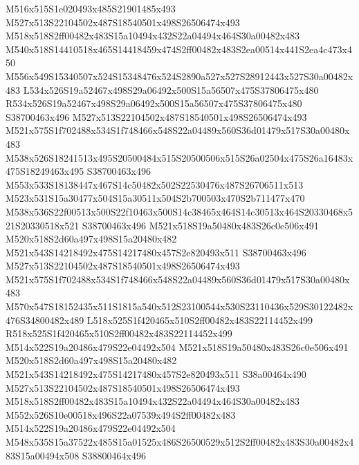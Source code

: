 \documentclass{article}
\begin{document}
\begin{multicols}{2}
M516x515S1e020493x485S21901485x493 M527x513S22104502x487S18540501x498S26506474x493 M518x518S2ff00482x483S15a10494x432S22a04494x464S30a00482x483 M540x518S14410518x465S14418459x474S2ff00482x483S2ea00514x441S2ea4c473x450 M556x549S15340507x524S15348476x524S2890a527x527S28912443x527S30a00482x483 L534x526S19a52467x498S29a06492x500S15a56507x475S37806475x480 R534x526S19a52467x498S29a06492x500S15a56507x475S37806475x480 S38700463x496 M527x513S22104502x487S18540501x498S26506474x493 M521x575S1f702488x534S1f748466x548S22a04489x560S36d01479x517S30a00480x483 M538x526S18241513x495S20500484x515S20500506x515S26a02504x475S26a16483x475S18249463x495 S38700463x496 M553x533S18138447x467S14c50482x502S22530476x487S26706511x513 M523x531S15a30477x504S15a30511x504S2b700503x470S2b711477x470 M538x536S22f00513x500S22f10463x500S14c38465x464S14c30513x464S20330468x521S20330518x521 S38700463x496 M521x518S19a50480x483S26c0e506x491 M520x518S2d60a497x498S15a20480x482 M521x543S14218492x475S14217480x457S2e820493x511 S38700463x496 M527x513S22104502x487S18540501x498S26506474x493 M521x575S1f702488x534S1f748466x548S22a04489x560S36d01479x517S30a00480x483 M570x547S18152435x511S1815a540x512S23100544x530S23110436x529S30122482x476S34800482x489 L518x525S1f420465x510S2ff00482x483S22114452x499 R518x525S1f420465x510S2ff00482x483S22114452x499 M514x522S19a20486x479S22e04492x504 M521x518S19a50480x483S26c0e506x491 M520x518S2d60a497x498S15a20480x482 M521x543S14218492x475S14217480x457S2e820493x511 S38a00464x490 M527x513S22104502x487S18540501x498S26506474x493 M518x518S2ff00482x483S15a10494x432S22a04494x464S30a00482x483 M552x526S10e00518x496S22a07539x494S2ff00482x483 M514x522S19a20486x479S22e04492x504 M548x535S15a37522x485S15a01525x486S26500529x512S2ff00482x483S30a00482x483S15a00494x508 S38800464x496


\end{multicols}
\end{document}
